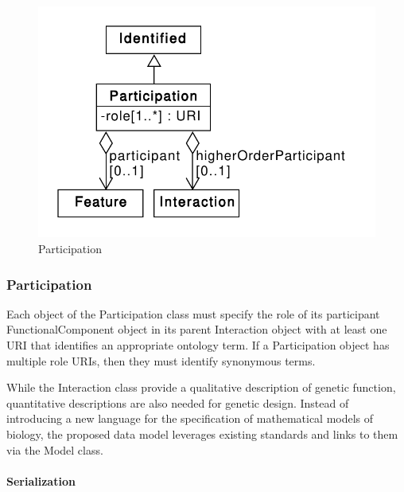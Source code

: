 \begin{figure}[ht]
\begin{center}
\includegraphics[scale=0.6]{uml/participation}
\caption[]{Participation}
\label{uml:participation}
\end{center}
\end{figure}

\subsubsection{Participation}
\label{sec:Participation}


Each object of the Participation class must specify the role of its participant FunctionalComponent object in its parent Interaction object with at least one URI that identifies an appropriate ontology term. If a Participation object has multiple role URIs, then they must identify synonymous terms. 



While the Interaction class provide a qualitative description of genetic function, quantitative descriptions are also needed for genetic design. Instead of introducing a new language for the specification of mathematical models of biology, the proposed data model leverages existing standards and links to them via the Model class. 

\paragraph{Serialization}

